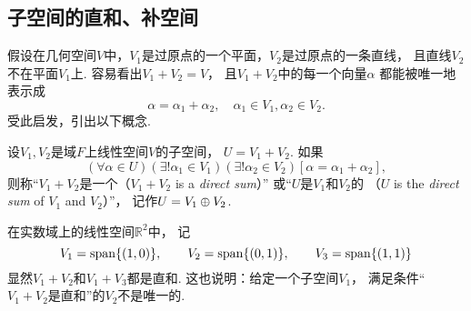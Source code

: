 \subsection{子空间的直和、补空间}
假设在几何空间\(V\)中，\(V_1\)是过原点的一个平面，\(V_2\)是过原点的一条直线，
且直线\(V_2\)不在平面\(V_1\)上.
容易看出\(V_1 + V_2 = V\)，
且\(V_1 + V_2\)中的每一个向量\(\alpha\)
都能被唯一地表示成\begin{equation*}
	\alpha = \alpha_1 + \alpha_2,
	\quad
	\alpha_1 \in V_1,
	\alpha_2 \in V_2.
\end{equation*}
受此启发，引出以下概念.
\begin{definition}
设\(V_1,V_2\)是域\(F\)上线性空间\(V\)的子空间，
\(U = V_1 + V_2\).
如果\begin{equation*}
	(\forall\alpha\in U)
	(\exists!\alpha_1\in V_1)
	(\exists!\alpha_2\in V_2)
	[\alpha=\alpha_1+\alpha_2],
\end{equation*}
则称“\(V_1+V_2\)是一个（\(V_1+V_2\) is a \emph{direct sum}）”
或“\(U\)是\(V_1\)和\(V_2\)的%
（\(U\) is the \emph{direct sum} of \(V_1\) and \(V_2\)）”，
记作\(U = V_1 \oplus V_2\).
\end{definition}

\begin{example}\label{example:线性空间.子空间.直和.例1}
在实数域上的线性空间\(\mathbb{R}^2\)中，
记\begin{equation*}
	V_1=\operatorname{span}\{(1,0)\},
	\qquad
	V_2=\operatorname{span}\{(0,1)\},
	\qquad
	V_3=\operatorname{span}\{(1,1)\}
\end{equation*}
显然\(V_1+V_2\)和\(V_1+V_3\)都是直和.
这也说明：给定一个子空间\(V_1\)，
满足条件“\(V_1+V_2\)是直和”的\(V_2\)不是唯一的.
\end{example}


